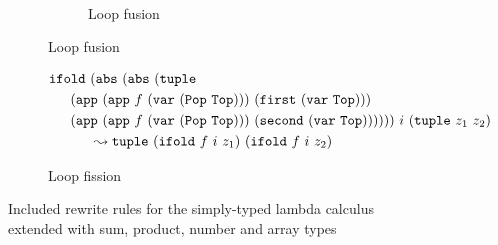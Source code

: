 \begin{figure}[]
\begin{subfigure}{0.48\textwidth}
\begin{subfigure}{1\textwidth}
\begin{align*}
      \end{align*}
      \caption{Loop fusion}
    \end{subfigure}
  \end{subfigure}
  \begin{subfigure}{1\textwidth}
    \begin{align*}
      \ifold{
        &(\abs{(\abs{
          (\tuple
          {\\&\hspace{-0.5cm}(\app{(\app{f}{(\var{(\Pop{\Top}))}})}
              {(\first{(\var{\Top})})})}
          {\\&\hspace{-0.5cm}(\app{(\app{f}{(\var{(\Pop{\Top}))}})}
              {(\second{(\var{\Top})})})})})})}
        {i}{(\tuple{z_1}{z_2})} \\
        & \leadsto \tuple{(\ifold{f}{i}{z_1})}{(\ifold{f}{i}{z_2})}
    \end{align*}
    \caption{Loop fission}
  \end{subfigure}
  \caption{Included rewrite rules for the simply-typed lambda calculus extended with sum, product, number and array types}
  \label{fig:rewrite_rules}
\end{figure}

